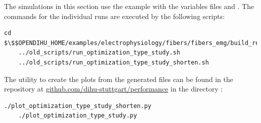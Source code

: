 
\begin{reproduce_no_break}
  The simulations in this section use the example 
   with the variables files  and .
  The commands for the individual runs are executed by the following scripts:
  \begin{lstlisting}[columns=fullflexible,breaklines=true,postbreak=\mbox{\textcolor{gray}{$\hookrightarrow$}\space}]
    cd $\$$OPENDIHU_HOME/examples/electrophysiology/fibers/fibers_emg/build_release
    ../old_scripts/run_optimization_type_study.sh
    ../old_scripts/run_optimization_type_study_shorten.sh
  \end{lstlisting}
  The utility to create the plots from the generated  files can be found in the repository at \href{https://github.com/dihu-stuttgart/performance}{github.com/dihu-stuttgart/performance}
  in the directory :
  \begin{lstlisting}[columns=fullflexible,breaklines=true,postbreak=\mbox{\textcolor{gray}{$\hookrightarrow$}\space}]
    ./plot_optimization_type_study_shorten.py
    ./plot_optimization_type_study.py
  \end{lstlisting}
\end{reproduce_no_break}

%
